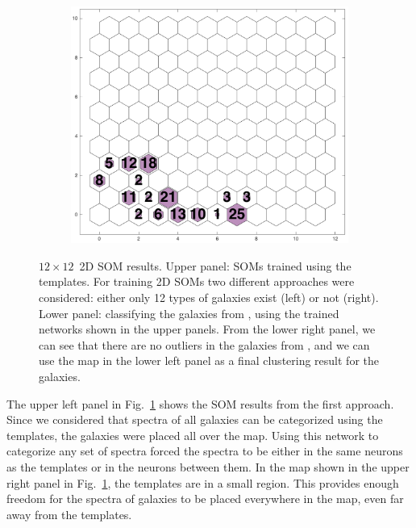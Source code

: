 \begin{figure}
\begin{subfigure}[b]{0.45\textwidth}
                \includegraphics[width=\textwidth]{images0.01/2d/hit_v_12_by_self_org_res12.png}
            \end{subfigure}
            \caption[$12\times12$ two-dimensional self-organizing map results]{$12\times12$~2D SOM results. Upper panel: SOMs trained using the \citet{Kinney96} templates. For training 2D SOMs two different approaches were considered: either only 12 types of galaxies exist (left) or not (right). Lower panel: classifying the galaxies from \citet{Hossein12}, using the trained networks shown in the upper panels. From the lower right panel, we can see that there are no outliers in the galaxies from , and we can use the map in the lower left panel as a final clustering result for the  galaxies.}
            \label{fig: 12by12}
        \end{figure}
    
        The upper left panel in Fig.~\ref{fig: 12by12} shows the SOM results from the first approach. 
        Since we considered that spectra of all galaxies can be categorized using the  templates, the galaxies were placed all over the map.
        Using this network to categorize any set of spectra forced the spectra to be either in the same neurons as the  templates or in the neurons between them.
        In the map shown in the upper right panel in Fig.~\ref{fig: 12by12}, the  templates are in a small region. This provides enough freedom for the spectra of galaxies to be placed everywhere in the map, even far away from the templates.
    
